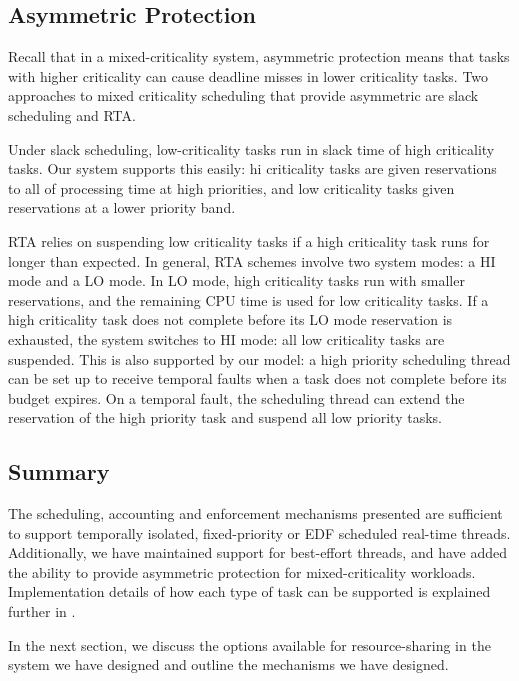 \subsection{Asymmetric Protection}

Recall that in a mixed-criticality system, asymmetric protection means that tasks with higher criticality can cause deadline misses in lower criticality tasks.
Two approaches to mixed criticality scheduling that provide asymmetric are slack scheduling and \gls{RTA}\citet{Burns_Davis_2013}.

Under slack scheduling, low-criticality tasks run in slack time of high criticality tasks.
Our system supports this easily: hi criticality tasks are given reservations to all of processing time at high priorities, and low criticality tasks given reservations at a lower priority band.

\gls{RTA} relies on suspending low criticality tasks if a high criticality task runs for longer than expected.
In general, \gls{RTA} schemes involve two system modes: a HI mode and a LO mode.
In LO mode, high criticality tasks run with smaller reservations, and the remaining CPU time is used for low criticality tasks.
If a high criticality task does not complete before its LO mode reservation is exhausted, the system switches to HI mode: all low criticality tasks are suspended.
This is also supported by our model: a high priority scheduling thread can be set up to receive temporal faults when a task does not complete before its budget expires.
On a temporal fault, the scheduling thread can extend the reservation of the high priority task and suspend all low priority tasks.

\subsection{Summary}

The scheduling, accounting and enforcement mechanisms presented are sufficient to support temporally isolated, fixed-priority or \gls{EDF} scheduled real-time threads.
Additionally, we have maintained support for best-effort threads, and have added the ability to provide asymmetric protection for mixed-criticality workloads.
Implementation details of how each type of task can be supported is explained further in .

In the next section, we discuss the options available for resource-sharing in the system we have designed and outline the mechanisms we have designed.


